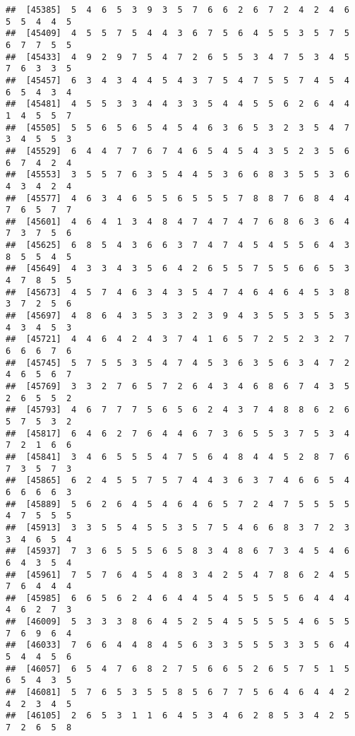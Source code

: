 \documentclass[
]{book}
\begin{document}
\begin{verbatim}
##  [45385]  5  4  6  5  3  9  3  5  7  6  6  2  6  7  2  4  2  4  6  5  5  4  4  5
##  [45409]  4  5  5  7  5  4  4  3  6  7  5  6  4  5  5  3  5  7  5  6  7  7  5  5
##  [45433]  4  9  2  9  7  5  4  7  2  6  5  5  3  4  7  5  3  4  5  7  6  3  3  5
##  [45457]  6  3  4  3  4  4  5  4  3  7  5  4  7  5  5  7  4  5  4  6  5  4  3  4
##  [45481]  4  5  5  3  3  4  4  3  3  5  4  4  5  5  6  2  6  4  4  1  4  5  5  7
##  [45505]  5  5  6  5  6  5  4  5  4  6  3  6  5  3  2  3  5  4  7  3  4  5  5  3
##  [45529]  6  4  4  7  7  6  7  4  6  5  4  5  4  3  5  2  3  5  6  6  7  4  2  4
##  [45553]  3  5  5  7  6  3  5  4  4  5  3  6  6  8  3  5  5  3  6  4  3  4  2  4
##  [45577]  4  6  3  4  6  5  5  6  5  5  5  7  8  8  7  6  8  4  4  7  6  5  7  7
##  [45601]  4  6  4  1  3  4  8  4  7  4  7  4  7  6  8  6  3  6  4  7  3  7  5  6
##  [45625]  6  8  5  4  3  6  6  3  7  4  7  4  5  4  5  5  6  4  3  8  5  5  4  5
##  [45649]  4  3  3  4  3  5  6  4  2  6  5  5  7  5  5  6  6  5  3  4  7  8  5  5
##  [45673]  4  5  7  4  6  3  4  3  5  4  7  4  6  4  6  4  5  3  8  3  7  2  5  6
##  [45697]  4  8  6  4  3  5  3  3  2  3  9  4  3  5  5  3  5  5  3  4  3  4  5  3
##  [45721]  4  4  6  4  2  4  3  7  4  1  6  5  7  2  5  2  3  2  7  6  6  6  7  6
##  [45745]  5  7  5  5  3  5  4  7  4  5  3  6  3  5  6  3  4  7  2  4  6  5  6  7
##  [45769]  3  3  2  7  6  5  7  2  6  4  3  4  6  8  6  7  4  3  5  2  6  5  5  2
##  [45793]  4  6  7  7  7  5  6  5  6  2  4  3  7  4  8  8  6  2  6  5  7  5  3  2
##  [45817]  6  4  6  2  7  6  4  4  6  7  3  6  5  5  3  7  5  3  4  7  2  1  6  6
##  [45841]  3  4  6  5  5  5  4  7  5  6  4  8  4  4  5  2  8  7  6  7  3  5  7  3
##  [45865]  6  2  4  5  5  7  5  7  4  4  3  6  3  7  4  6  6  5  4  6  6  6  6  3
##  [45889]  5  6  2  6  4  5  4  6  4  6  5  7  2  4  7  5  5  5  5  4  7  5  5  5
##  [45913]  3  3  5  5  4  5  5  3  5  7  5  4  6  6  8  3  7  2  3  3  4  6  5  4
##  [45937]  7  3  6  5  5  5  6  5  8  3  4  8  6  7  3  4  5  4  6  6  4  3  5  4
##  [45961]  7  5  7  6  4  5  4  8  3  4  2  5  4  7  8  6  2  4  5  7  6  4  4  4
##  [45985]  6  6  5  6  2  4  6  4  4  5  4  5  5  5  5  6  4  4  4  4  6  2  7  3
##  [46009]  5  3  3  3  8  6  4  5  2  5  4  5  5  5  5  4  6  5  5  7  6  9  6  4
##  [46033]  7  6  6  4  4  8  4  5  6  3  3  5  5  5  3  3  5  6  4  5  4  4  5  6
##  [46057]  6  5  4  7  6  8  2  7  5  6  6  5  2  6  5  7  5  1  5  6  5  4  3  5
##  [46081]  5  7  6  5  3  5  5  8  5  6  7  7  5  6  4  6  4  4  2  4  2  3  4  5
##  [46105]  2  6  5  3  1  1  6  4  5  3  4  6  2  8  5  3  4  2  5  7  2  6  5  8

\end{verbatim}
\end{document}
